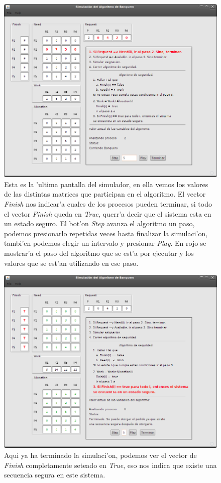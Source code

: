 \begin{figure}
\centering
 \includegraphics[scale=0.4,keepaspectratio=true]{./imagenes/banquero/banquero3.png}
 \caption{Esta es la 'ultima pantalla del simulador, en ella vemos los valores de las distintas matrices que participan en el algoritmo. El vector \emph{Finish} nos indicar'a cuales de los procesos pueden terminar, si todo el vector \emph{Finish} queda en \emph{True}, querr'a decir que el sistema esta en un estado seguro. El bot'on \emph{Step} avanza el algoritmo un paso, podemos presionarlo repetidas veces hasta finalizar la simulaci'on, tambi'en podemos elegir un intervalo y presionar \emph{Play}. En rojo se mostrar'a el paso del algoritmo que se est'a por ejecutar y los valores que se est'an utilizando en ese paso.} 
\end{figure}
\begin{figure}
\centering
 \includegraphics[scale=0.4,keepaspectratio=true]{./imagenes/banquero/banquero4.png}
 \caption{Aqui ya ha terminado la simulaci'on, podemos ver el vector de \emph{Finish} completamente seteado en \emph{True}, eso nos indica que existe una secuencia segura en este sistema.} 
\end{figure}